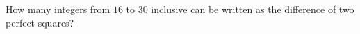 How many integers from $16$ to $30$ inclusive can be written as the difference of two perfect squares?
